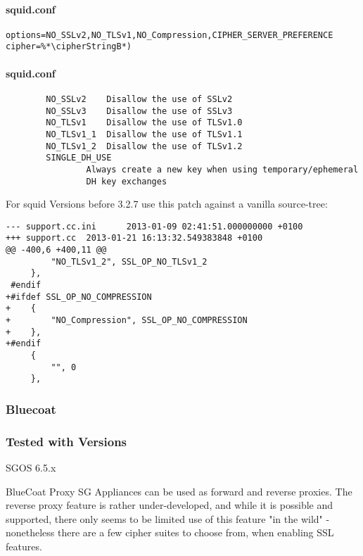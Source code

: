 \paragraph*{squid.conf}
\begin{lstlisting}
options=NO_SSLv2,NO_TLSv1,NO_Compression,CIPHER_SERVER_PREFERENCE 
cipher=%*\cipherStringB*)
\end{lstlisting}

\paragraph*{squid.conf}
\begin{lstlisting}
		NO_SSLv2    Disallow the use of SSLv2
		NO_SSLv3    Disallow the use of SSLv3
		NO_TLSv1    Disallow the use of TLSv1.0
		NO_TLSv1_1  Disallow the use of TLSv1.1
		NO_TLSv1_2  Disallow the use of TLSv1.2
		SINGLE_DH_USE
				Always create a new key when using temporary/ephemeral
				DH key exchanges
\end{lstlisting}

For squid Versions before 3.2.7 use this patch against a vanilla source-tree:

\begin{lstlisting}
--- support.cc.ini      2013-01-09 02:41:51.000000000 +0100
+++ support.cc  2013-01-21 16:13:32.549383848 +0100
@@ -400,6 +400,11 @@
         "NO_TLSv1_2", SSL_OP_NO_TLSv1_2
     },
 #endif
+#ifdef SSL_OP_NO_COMPRESSION
+    {
+        "NO_Compression", SSL_OP_NO_COMPRESSION
+    },
+#endif
     {
         "", 0
     },
\end{lstlisting}


\subsubsection{Bluecoat}
\subsubsection{Tested with Versions}
\begin{itemize*}
  \item SGOS 6.5.x
\end{itemize*}

BlueCoat Proxy SG Appliances can be used as forward and reverse proxies. The reverse proxy feature is rather under-developed, and while it is possible and supported, there only seems to be limited use of this feature "in the wild" - nonetheless there are a few cipher suites to choose from, when enabling SSL features.

